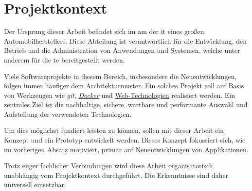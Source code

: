 \section{Projektkontext}
\label{sec:01-02_project-context}

Der Ursprung dieser Arbeit befindet sich im \Gls{am} der \Gls{it} eines großen Automobilherstellers. Diese Abteilung ist verantwortlich für die Entwicklung, den Betrieb und die Administration von Anwendungen und Systemen, welche unter anderem für die \Gls{te} bereitgestellt werden.

Viele Softwareprojekte in diesem Bereich, insbesondere die Neuentwicklungen, folgen immer häufiger dem  Architekturmuster. Ein solches Projekt soll auf Basis von Werkzeugen wie \textit{\Gls{git}}, \textit{\hyperref[sec:02-03_containerization]{Docker}} und \hyperref[sec:02-01_web-development]{Web-Technologien} realisiert werden. Ein zentrales Ziel ist die nachhaltige, sichere, wartbare und performante Auswahl und Aufstellung der verwendeten Technologien.

Um dies möglichst fundiert leisten zu können, sollen mit dieser Arbeit ein Konzept und ein Prototyp entwickelt werden. Dieses Konzept fokussiert sich, wie im vorherigen Absatz motiviert, primär auf Neuentwicklungen von Applikationen.

Trotz enger fachlicher Verbindungen wird diese Arbeit organisatorisch unabhängig vom Projektkontext durchgeführt. Die Erkenntnisse sind daher universell einsetzbar.
